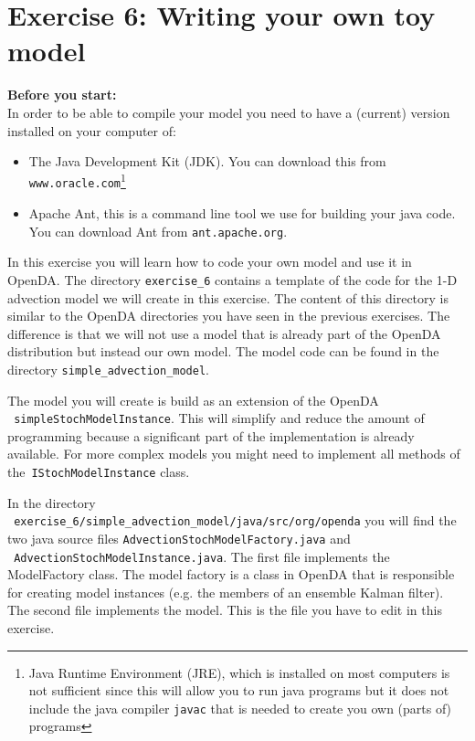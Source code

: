 \documentclass[a4paper,10pt]{article}
\begin{document}
\section{Exercise 6: Writing your own toy model}

{\bf Before you start:}\\
In order to be able to compile your model you need to have a (current) version
installed on your computer of:
\begin{itemize}
\item The Java Development Kit (JDK). You can download this from\\
      {\tt www.oracle.com}\footnote{Java Runtime Environment (JRE), which is
      installed on most computers is not sufficient since this will allow you
      to run java programs but it does not include the java compiler {\tt javac} that is
      needed to create you own (parts of) programs}
\item Apache Ant, this is a command line tool we use for building your java
      code. You can download Ant from {\tt ant.apache.org}.
\end{itemize}

In this exercise you will learn how to code your own model and use it in
OpenDA. The directory {\tt exercise\_6} contains a template of the code for the
1-D advection model we will create in this exercise. The content of this
directory is similar to the OpenDA directories you have seen in the previous
exercises. The difference is that we will not use a model that is already part
of the OpenDA distribution but instead our own model. The model code can be
found in the directory {\tt simple\_advection\_model}.

The model you will create is build as an extension of the OpenDA \\{\tt
  simpleStochModelInstance}. This will simplify and reduce the amount of
programming because a significant part of the implementation is already
available. For more complex models you might need to implement all methods of
the\ {\tt IStochModelInstance} class.

In the directory\\ {\tt
  exercise\_6/simple\_advection\_model/java/src/org/openda} you will find the
two java source files {\tt AdvectionStochModelFactory.java} and\\ {\tt
  AdvectionStochModelInstance.java}. The first file implements the ModelFactory
class. The model factory is a class in OpenDA that is responsible for creating
model instances (e.g. the members of an ensemble Kalman filter). The second
file implements the model. This is the file you have to edit in this exercise.
\end{document}
